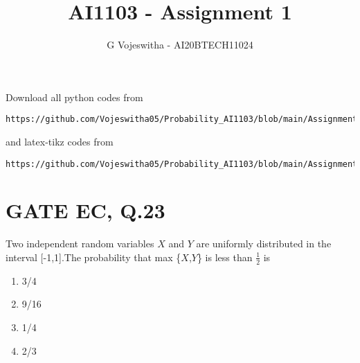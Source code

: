\documentclass[journal,12pt,twocolumn]{IEEEtran}
\begin{document}
     \def\centbox#1{\makebox[0in]{#1}}
     \def\topbox#1{\raisebox{-\baselineskip}[0in][0in]{#1}}
     \def\midbox#1{\raisebox{-0.5\baselineskip}[0in][0in]{#1}}
\vspace{3cm}
\title{AI1103 - Assignment 1}
\author{G Vojeswitha - AI20BTECH11024}
\maketitle
\newpage
\bigskip
\renewcommand{\thefigure}{\theenumi}
\renewcommand{\thetable}{\theenumi}
Download all python codes from 
\begin{lstlisting}
https://github.com/Vojeswitha05/Probability_AI1103/blob/main/Assignment_4/simulation_4.py
\end{lstlisting}
%
and latex-tikz codes from 
%
\begin{lstlisting}
https://github.com/Vojeswitha05/Probability_AI1103/blob/main/Assignment_4/latex_4.tex
\end{lstlisting}
\section{GATE EC, Q.23}
Two independent random variables \(X\) and \(Y\)
are uniformly distributed in the interval [-1,1].The probability that max \{\(X\),\(Y\)\} is less than \(\frac{1}{2}\) is
\begin{enumerate}[label={\Alph*)}]
    \item 3/4
    \item 9/16
    \item 1/4
    \item 2/3
\end{enumerate}
\end{document}
